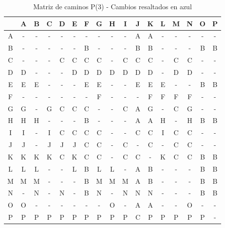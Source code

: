 \documentclass[12pt]{article}
\begin{document}
\begin{table}[h!]
\centering
\begin{tabular}{|c|c|c|c|c|c|c|c|c|c|c|c|c|c|c|c|c|}
\hline
 & A & B & C & D & E & F & G & H & I & J & K & L & M & N & O & P \\\hline
A & - & - & - & - & - & - & - & - & - & A & A & - & - & - & - & - \\\hline
B & - & - & - & - & - & B & - & - & - & B & B & - & - & - & B & B \\\hline
C & - & - & - & C & C & C & C & - & C & C & C & - & C & C & - & - \\\hline
D & D & - & - & - & D & D & D & D & D & D & D & - & D & D & - & - \\\hline
E & E & E & - & - & - & E & E & - & - & E & E & E & - & - & B & B \\\hline
F & - & - & - & - & - & - & F & - & - & - & F & F & F & F & - & - \\\hline
G & G & - & G & \cellcolor{lightblue} C & \cellcolor{lightblue} C & \cellcolor{lightblue} C & - & - & \cellcolor{lightblue} C & A & G & - & \cellcolor{lightblue} C & G & - & - \\\hline
H & H & H & - & - & - & B & - & - & - & A & A & H & - & H & B & B \\\hline
I & I & - & I & \cellcolor{lightblue} C & \cellcolor{lightblue} C & \cellcolor{lightblue} C & \cellcolor{lightblue} C & - & - & \cellcolor{lightblue} C & \cellcolor{lightblue} C & I & \cellcolor{lightblue} C & \cellcolor{lightblue} C & - & - \\\hline
J & J & - & J & J & J & \cellcolor{lightblue} C & \cellcolor{lightblue} C & - & \cellcolor{lightblue} C & - & \cellcolor{lightblue} C & - & \cellcolor{lightblue} C & \cellcolor{lightblue} C & - & - \\\hline
K & K & K & K & \cellcolor{lightblue} C & K & \cellcolor{lightblue} C & \cellcolor{lightblue} C & - & \cellcolor{lightblue} C & \cellcolor{lightblue} C & - & K & \cellcolor{lightblue} C & \cellcolor{lightblue} C & B & B \\\hline
L & L & L & - & - & L & B & L & L & - & A & B & - & - & - & B & B \\\hline
M & M & M & - & - & - & B & M & M & M & A & B & - & - & - & B & B \\\hline
N & - & N & - & N & - & B & N & - & N & N & N & - & - & - & B & B \\\hline
O & O & - & - & - & - & - & - & O & - & A & A & - & - & O & - & - \\\hline
P & P & P & P & P & P & P & P & P & P & \cellcolor{lightblue} C & P & P & P & P & P & - \\\hline
\end{tabular}
\caption{Matriz de caminos P(3) - Cambios resaltados en azul}
\end{table}
\end{document}
